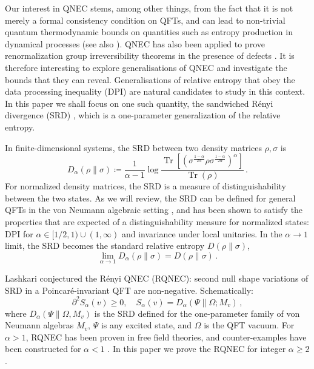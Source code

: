 \documentclass[11pt,a4paper]{article}
\theoremstyle{plain}
\numberwithin{theorem}{section}
\theoremstyle{definition}
\newcommand{\?}{\overset{?}{=}}
\DeclareMathOperator{\Tr}{Tr}
\newcommand{\lB}{\left [}
\newcommand{\rB}{\right ]}
\newcommand{\lb}{\left (}
\newcommand{\rb}{\right )}
\newcommand{\I}{\infty}
\renewcommand{\a}{\alpha}	%
\begin{document}
Our interest in QNEC stems, among other things, from the fact that it is not merely a formal consistency condition on QFTs, and can lead to non-trivial quantum thermodynamic bounds on quantities such as entropy production in dynamical processes \cite{Kibe:2021qjy,Banerjee:2022dgv,Kibe:2024icu,Kibe:2025cqc} (see also \cite{Mezei:2019sla}). QNEC has also been applied to prove renormalization group irreversibility theorems in the presence of defects \cite{Casini:2023kyj}.
It is therefore interesting to explore generalisations of QNEC and investigate the bounds that they can reveal. 
Generalisations of relative entropy that obey the data processing inequality (DPI) are natural candidates to study in this context.
In this paper we shall focus on one such quantity, the sandwiched R\'enyi divergence (SRD) \cite{Muller-Lennert:2013liu,Wilde:2013bdg}, which is a one-parameter generalization of the relative entropy.

 In finite-dimensional systems, the SRD between two density matrices $\rho,\sigma$ is \cite{Muller-Lennert:2013liu}
\begin{equation}\label{Eq:SRD-finite}
    {D}_{\alpha}(\rho\|\sigma) \coloneqq \frac{1}{\alpha-1}\log \frac{\Tr\lB\lb\sigma^{\frac{1-\alpha}{2\alpha}}\rho\sigma^{\frac{1-\alpha}{2\alpha}}\rb^\alpha\rB}{\Tr(\rho)}\,.
\end{equation}
For normalized density matrices, the SRD is a measure of distinguishability between the two states. As we will review, the SRD can be defined for general QFTs  in the von Neumann algebraic setting \cite{Berta:2016vnw,Jencova:2016tqz,Jencova:2017txf}, and has been shown to satisfy the properties that are expected of a distinguishability measure for normalized states: DPI for $\a\in [1/2, 1)\cup(1,\I)$ and invariance under local unitaries. In the $\alpha \to 1$ limit, the SRD becomes the standard relative entropy $D(\rho\|\sigma)$,
\begin{equation}
    \lim_{\alpha \to 1} {D}_{\alpha}(\rho\|\sigma)= D(\rho\|\sigma)\,.
\end{equation}

Lashkari \cite{Lashkari:2018nsl} conjectured the R\'{e}nyi QNEC (RQNEC): second null shape variations of SRD in a Poincar\'{e}-invariant QFT  are non-negative. Schematically:
\begin{equation}
  \partial^2S_\a(v) \geq0, \quad S_\a(v)= D_\a(\Psi\|\Omega; M_v)\,,
\end{equation}
where $D_\a(\Psi\|\Omega, M_v)$ is the SRD defined for the one-parameter family of von Neumann algebras $M_v$, $\Psi$ is any excited state, and $\Omega$ is the QFT vacuum. For $\a>1$, RQNEC has been proven in free field theories, and counter-examples have been constructed for $\a<1$ \cite{Moosa:2020jwt,Roy:2022yzm}. In this paper we prove the RQNEC for integer $\alpha\geq 2$.
\end{document}
